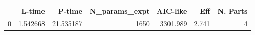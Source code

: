 \begin{tabular}{lrrrrrr}
\toprule
{} &    L-time &     P-time &  N\_params\_expt &  AIC-like &    Eff &  N. Parts \\
\midrule
0 &  1.542668 &  21.535187 &           1650 &  3301.989 &  2.741 &         4 \\
\bottomrule
\end{tabular}
